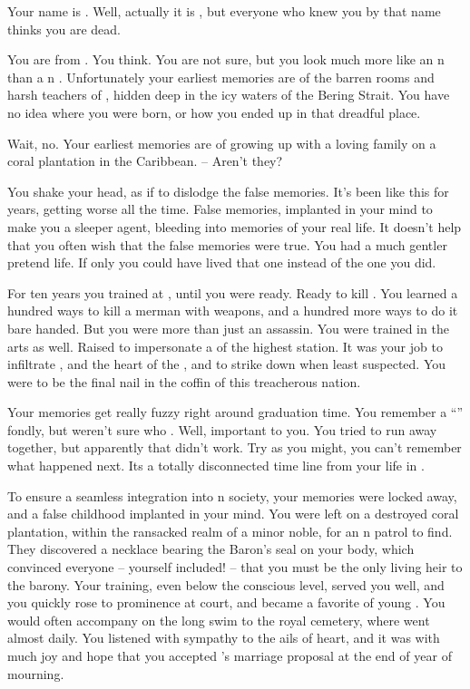 \documentclass[char]{NeptuneBall}
\begin{document}
\name{\cQueen{}}


Your name is \cQueen{\MYname}. Well, actually it is \cQueen{\King} \cQueen{}, but everyone who knew you by that name thinks you are dead.

You are from \pAtlantis{}. You think. You are not sure, but you look much more like an \pAtlantis{}n than a \pPacifica{}n \cQueen{\mer{}}. Unfortunately your earliest memories are of the barren rooms and harsh teachers of \pAssassin{}, hidden deep in the icy waters of the Bering Strait. You have no idea where you were born, or how you ended up in that dreadful place. 

Wait, no. Your earliest memories are of growing up with a loving family on a coral plantation in the Caribbean. -- Aren't they?

You shake your head, as if to dislodge the false memories. It's been like this for years, getting worse all the time. False memories, implanted in your mind to make you a sleeper agent, bleeding into memories of your real life. It doesn't help that you often wish that the false memories were true. You had a much gentler pretend life. If only you could have lived that one instead of the one you did.

For ten years you trained at \pAssassin{}, until you were ready. Ready to kill \cKing{\King} \cKing{}. You learned a hundred ways to kill a merman with weapons, and a hundred more ways to do it bare handed. But you were more than just an assassin. You were trained in the arts as well. Raised to impersonate a \cAthena{\mer} of the highest station. It was your job to infiltrate \pAtlantis{}, and the heart of the \cKing{\King}, and to strike \cKing{\them} down when \pAtlantis{} least suspected. You were to be the final nail in the coffin of this treacherous nation.

Your memories get really fuzzy right around graduation time.  You remember a ``\cDiplomat{}'' fondly, but weren't sure who \cDiplomat{\they} \cDiplomat{\are}. Well, \cDiplomat{\they} \cDiplomat{\were} important to you. You tried to run away together, but apparently that didn't work. Try as you might, you can't remember what happened next. Its a totally disconnected time line from your life in \pAtlantis{}.

To ensure a seamless integration into \pAtlantis{}n society, your memories were locked away, and a false childhood implanted in your mind. You were left on a destroyed coral plantation, within the ransacked realm of a minor noble, for an \pAtlantis{}n patrol to find.  They discovered a necklace bearing the Baron's seal on your body, which convinced everyone -- yourself included! -- that you must be the only living heir to the barony.  Your training, even below the conscious level, served you well, and you quickly rose to prominence at court, and became a favorite of young \cKing{\King} \cKing{}. You would often accompany \cKing{\them} on the long swim to the royal cemetery, where \cKing{\they} went almost daily. You listened with sympathy to the ails of \cKing{\their} heart, and it was with much joy and hope that you accepted \cKing{\King} \cKing{}'s marriage proposal at the end of \cKing{\their} year of mourning.
\end{document}
